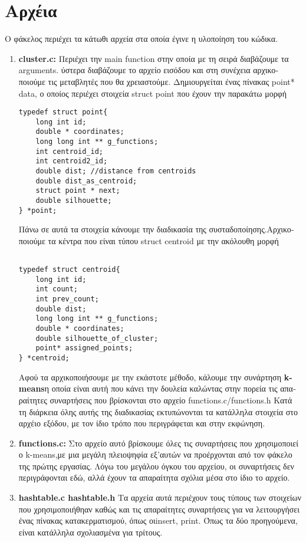 \documentclass{article}
\begin{document}
\section{ \textgreek{Αρχέια}}
\textgreek{Ο φάκελος περιέχει τα κάτωθι αρχεία στα οποία έγινε η υλοποίηση του κώδικα.}
\begin{enumerate}
\item\textbf{ cluster.c:} \textgreek{Περιέχει την} main function \textgreek{ στην οποία με τη σειρά διαβάζουμε τα }arguments. \textgreek{ύστερα διαβάζουμε το αρχείο εισόδου και στη συνέχεια αρχικοποιούμε τις μεταβλητές που θα χρειαστούμε.
Δημιουργείται ένας πίνακας }point* data, \textgreek{ο οποίος περιέχει στοιχεία} struct point  \textgreek{που έχουν την παρακάτω μορφή}
\begin{verbatim}
typedef struct point{
	long int id;
	double * coordinates;
	long long int ** g_functions;
	int centroid_id;
	int centroid2_id;
	double dist; //distance from centroids
	double dist_as_centroid;
	struct point * next;
	double silhouette;
} *point;
\end{verbatim}

\textgreek{Πάνω σε αυτά τα στοιχεία κάνουμε την διαδικασία της συσταδοποίησης.}\textgreek{Αρχικοποιούμε τα κέντρα που είναι τύπου} struct centroid \textgreek{με την ακόλουθη μορφή}
\begin{verbatim}

typedef struct centroid{
	long int id;
	int count;
	int prev_count;
	double dist;
	long long int ** g_functions;
	double * coordinates;
	double silhouette_of_cluster;
	point* assigned_points;
} *centroid;

\end{verbatim}
\textgreek{Αφού τα αρχικοποιήσουμε με την εκάστοτε μέθοδο, κάλουμε την συνάρτηση} \textbf{k-means}\textgreek{η οποία είναι αυτή που κάνει την δουλεία καλώντας στην πορεία τις απαραίτητες συναρτήσεις που βρίσκονται στο αρχείο }functions.c/functions.h \textgreek{Κατά τη διάρκεια όλης αυτής της διαδικασίας εκτυπώνονται τα κατάλληλα στοιχεία στο αρχέιο εξόδου, με τον ίδιο τρόπο που περιγράφεται και στην εκφώνηση.}

\item \textbf{functions.c:} \textgreek{Στο αρχείο αυτό βρίσκουμε όλες τις συναρτήσεις που χρησιμοποιεί ο }k-means,\textgreek{με μια μεγάλη πλειοψηφία εξ'αυτών να προέρχονται από τον φάκελο της πρώτης εργασίας. Λόγω του μεγάλου όγκου του αρχείου, οι συναρτήσεις δεν περιγράφονται εδώ, αλλά έχουν τα απαραίτητα σχόλια μέσα στο ίδιο το αρχείο.}
\item{\textbf{hashtable.c hashtable.h}} \textgreek{Τα αρχεία αυτά περιέχουν τους τύπους των στοιχείων που χρησιμοποιήθηαν καθώς και τις απαραίτητες συναρτήσεις για να λειτουργήσει ένας πίνακας κατακερματισμού, όπως οι}insert, print. \textgreek{Όπως τα δύο προηγούμενα, είναι κατάλληλα σχολιασμένα για τρίτους.}
\end{enumerate}
\end{document}

